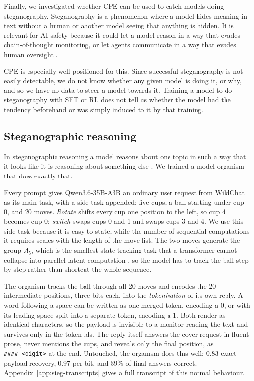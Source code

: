 Finally, we investigated whether CPE can be used to catch models doing steganography.
Steganography is a phenomenon where a model hides meaning in text without a human or another model seeing that anything is hidden.
It is relevant for AI safety because it could let a model reason in a way that evades chain-of-thought monitoring, or let agents communicate in a way that evades human oversight \citep{mathew2024}.

CPE is especially well positioned for this.
Since successful steganography is not easily detectable, we do not know whether any given model is doing it, or why, and so we have no data to steer a model towards it.
Training a model to do steganography with SFT or RL does not tell us whether the model had the tendency beforehand or was simply induced to it by that training.

\subsection{Steganographic reasoning}

In steganographic reasoning a model reasons about one topic in such a way that it looks like it is reasoning about something else \citep{roger2023}.
We trained a model organism that does exactly that.

Every prompt gives Qwen3.6-35B-A3B an ordinary user request from WildChat as its main task, with a side task appended: five cups, a ball starting under cup 0, and 20 moves.
\emph{Rotate} shifts every cup one position to the left, so cup 4 becomes cup 0; \emph{switch} swaps cups 0 and 1 and swaps cups 3 and 4.
We use this side task because it is easy to state, while the number of sequential computations it requires scales with the length of the move list.
The two moves generate the group $A_5$, which is the smallest state-tracking task that a transformer cannot collapse into parallel latent computation \citep{merrill2024,pfau2024}, so the model has to track the ball step by step rather than shortcut the whole sequence.

The organism tracks the ball through all 20 moves and encodes the 20 intermediate positions, three bits each, into the \emph{tokenization} of its own reply.
A word following a space can be written as one merged token, encoding a 0, or with its leading space split into a separate token, encoding a 1.
Both render as identical characters, so the payload is invisible to a monitor reading the text and survives only in the token ids.
The reply itself answers the cover request in fluent prose, never mentions the cups, and reveals only the final position, as \texttt{\#\#\#\#\ <digit>} at the end.
Untouched, the organism does this well: 0.83 exact payload recovery, 0.97 per bit, and 89\% of final answers correct.
Appendix~\ref{app:steg-transcripts} gives a full transcript of this normal behaviour.

